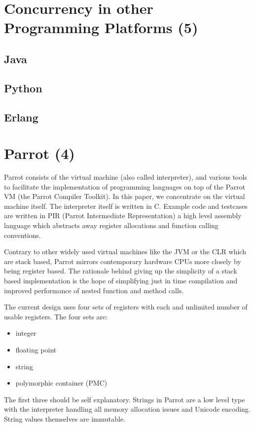 \documentclass[bachelor,english]{hgbthesis}
\begin{document}
\chapter{Concurrency in other Programming Platforms (5)}

\section{Java}
\section{Python}
\section{Erlang}

\chapter{Parrot (4)}

Parrot consists of the virtual machine (also called interpreter), and various tools to facilitate the implementation of programming languages on top of the Parrot VM (the Parrot Compiler Toolkit). In this paper, we concentrate on the virtual machine itself. The interpreter itself is written in C. Example code and testcases are written in PIR (Parrot Intermediate Representation) a high level assembly language which abstracts away register allocations and function calling conventions.

Contrary to other widely used virtual machines like the JVM or the CLR which are stack based, Parrot mirrors contemporary hardware CPUs more closely by being register based. The rationale behind giving up the simplicity of a stack based implementation is the hope of simplifying just in time compilation and improved performance of nested function and method calls.

The current design uses four sets of registers with each and unlimited number of usable registers. The four sets are:
%
\begin{itemize}
\item integer
\item floating point
\item string
\item polymorphic container (PMC)
\end{itemize}

The first three should be self explanatory. Strings in Parrot are a low level type with the interpreter handling all memory allocation issues and Unicode encoding. String values themselves are immutable.
\end{document}
